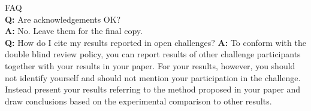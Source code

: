 \documentclass[10pt,twocolumn,letterpaper]{article}
\begin{document}

\medskip

\noindent
FAQ\medskip\\
{\bf Q:} Are acknowledgements OK?\\
{\bf A:} No.  Leave them for the final copy.\medskip\\
{\bf Q:} How do I cite my results reported in open challenges?
{\bf A:} To conform with the double blind review policy, you can report results of other challenge participants together with your results in your paper. For your results, however, you should not identify yourself and should not mention your participation in the challenge. Instead present your results referring to the method proposed in your paper and draw conclusions based on the experimental comparison to other results.\medskip\\
\end{document}
